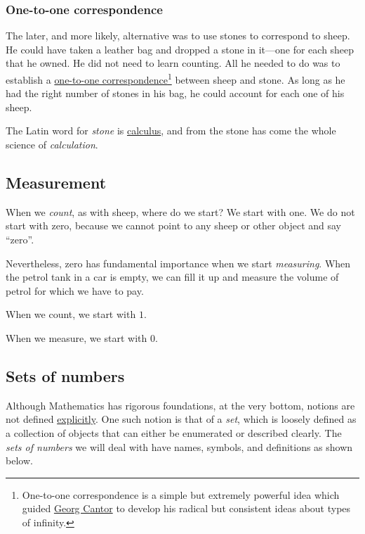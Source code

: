 \documentclass[
  a4paper,
]{article}
\begin{document}
\hypertarget{one-to-one-correspondence}{%
\subsubsection{One-to-one
correspondence}\label{one-to-one-correspondence}}

The later, and more likely, alternative was to use stones to correspond
to sheep. He could have taken a leather bag and dropped a stone in
it---one for each sheep that he owned. He did not need to learn
counting. All he needed to do was to establish a
\href{https://www.encyclopedia.com/science/encyclopedias-almanacs-transcripts-and-maps/one-one-correspondence}{one-to-one
correspondence}\footnote{One-to-one correspondence is a simple but
  extremely powerful idea which guided
  \href{https://www.britannica.com/science/one-to-one-correspondence}{Georg
  Cantor} to develop his radical but consistent ideas about types of
  infinity.} between sheep and stone. As long as he had the right number
of stones in his bag, he could account for each one of his sheep.

The Latin word for \emph{stone} is
\href{https://www.etymonline.com/search?q=calculus}{calculus}, and from
the stone has come the whole science of \emph{calculation}.

\hypertarget{measurement}{%
\subsection{Measurement}\label{measurement}}

When we \emph{count}, as with sheep, where do we start? We start with
one. We do not start with zero, because we cannot point to any sheep or
other object and say ``zero''.

Nevertheless, zero has fundamental importance when we start
\emph{measuring}. When the petrol tank in a car is empty, we can fill it
up and measure the volume of petrol for which we have to pay.

When we count, we start with \(1\).

When we measure, we start with \(0\).

\hypertarget{sets-of-numbers}{%
\subsection{Sets of numbers}\label{sets-of-numbers}}

Although Mathematics has rigorous foundations, at the very bottom,
notions are not defined
\href{https://www.vocabulary.com/dictionary/explicitly}{explicitly}. One
such notion is that of a \emph{set}, which is loosely defined as a
collection of objects that can either be enumerated or described
clearly. The \emph{sets of numbers} we will deal with have names,
symbols, and definitions as shown below.
\end{document}
